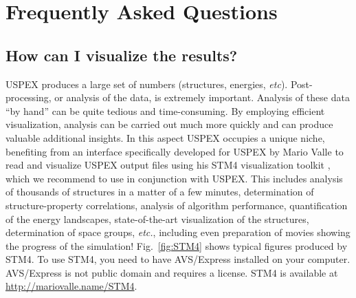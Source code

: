 \documentclass[12pt]{article}
\begin{document}
\newpage
\section{Frequently Asked Questions}

\subsection{How can I visualize the results?} \label{faq_visualization}
USPEX produces a large set of numbers (structures, energies, \emph{etc}).
Post-processing, or analysis of the data, is extremely important. Analysis of
these data ``by hand'' can be quite tedious and time-consuming. By employing
efficient visualization, analysis can be carried out much more quickly and can
produce valuable additional insights. In this aspect USPEX occupies a unique
niche, benefiting from an interface specifically developed for USPEX by Mario
Valle to read and visualize USPEX output files using his STM4 visualization
toolkit \cite{Valle2005}, which we recommend to use in conjunction with USPEX.
This includes analysis of thousands of structures in a matter of a few minutes,
determination of structure-property correlations, analysis of algorithm
performance, quantification of the energy landscapes, state-of-the-art
visualization of the structures, determination of space groups, \emph{etc.},
including even preparation of movies showing the progress of the simulation!
Fig.~\ref{fig:STM4} shows typical figures produced by STM4. To use STM4, you
need to have AVS/Express installed on your computer. AVS/Express is not public
domain and requires a license. STM4 is available at
\textcolor{blue}{\url{http://mariovalle.name/STM4}}.
\end{document}
